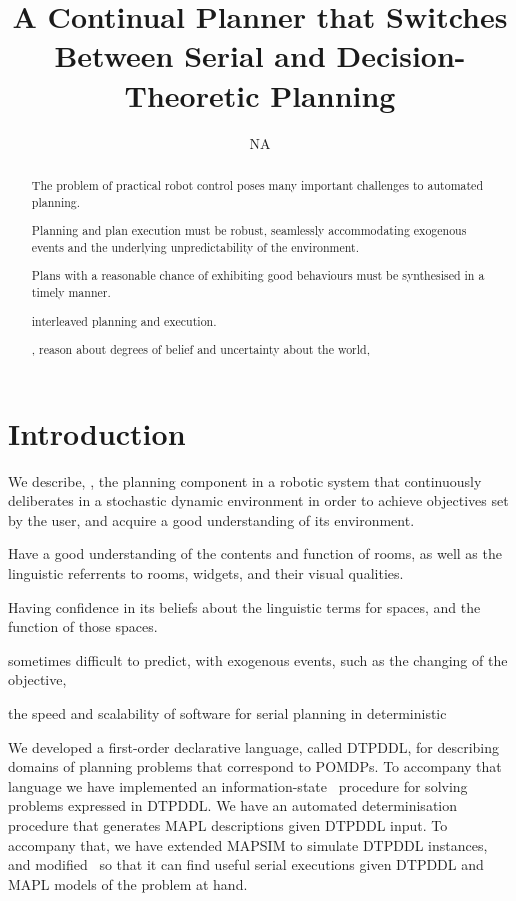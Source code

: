 \documentclass[letterpaper]{article}
\title{A Continual Planner that Switches Between Serial and
  Decision-Theoretic Planning}
\author{NA}
\begin{document}
 
\maketitle

\begin{abstract}

The problem of practical robot control poses many important challenges
to automated planning. 

Planning and plan execution must be robust, seamlessly accommodating
exogenous events and the underlying unpredictability of the
environment. 

Plans with a reasonable chance of exhibiting good behaviours must be
synthesised in a timely manner.

interleaved planning and execution. 

, reason about degrees of belief and uncertainty about the world, 

\end{abstract}

\section{Introduction}

We describe, \pcogx, the planning component in a robotic system that
continuously deliberates in a stochastic dynamic environment in order
to achieve objectives set by the user, and acquire a good
understanding of its environment.

Have a good understanding of the contents and function of rooms, as
well as the linguistic referrents to rooms, widgets, and their visual
qualities.

Having confidence in its beliefs about the linguistic terms for
spaces, and the function of those spaces.



sometimes difficult to predict, with exogenous events, such as the
changing of the objective, 





the speed and scalability of software for serial planning in
deterministic




We developed a first-order declarative language, called DTPDDL, for
describing domains of planning problems that correspond to POMDPs.  To
accompany that language we have implemented an information-state
\laostar\ procedure for solving problems expressed in DTPDDL. We have
an automated determinisation procedure that generates MAPL
descriptions given DTPDDL input. To accompany that, we have extended
MAPSIM to simulate DTPDDL instances, and modified \fastdownward\ so
that it can find useful serial executions given DTPDDL and MAPL models
of the problem at hand.
\end{document}
